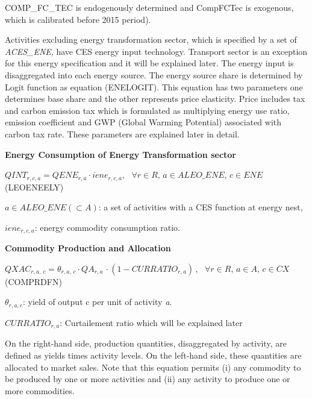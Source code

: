 \documentclass[10pt,a4paper,titlepage,dvipdfmx]{book}
\begin{document}
COMP\_FC\_TEC  is endogenously determined and CompFCTec is exogenous, which is calibrated before 2015 period).

Activities excluding energy transformation sector, which is specified by a set of \textit{ACES\_ENE}, have CES energy input technology. Transport sector is an exception for this energy specification and it will be explained later. The energy input is disaggregated into each energy source. The energy source share is determined by Logit function as equation (ENELOGIT). This equation has two parameters one determines base share and the other represents price elasticity. Price includes tax and carbon emission tax which is formulated as multiplying energy use ratio, emission coefficient and GWP (Global Warming Potential) associated with carbon tax rate. These parameters are explained later in detail.

\begin{flushleft}\textbf{Energy Consumption of Energy Transformation sector}\end{flushleft}


\begin{center}$QINT_{r,c,a}=QENE_{r,a}\cdot iene_{r,c,a},\,\,\,\,\forall r\in R,\,a\in ALEO\_ ENE,\,c\in ENE$ (LEOENEELY)
\end{center}

$a\in ALEO\_ ENE\left(\subset A\right)$: a set of activities with a CES function at energy nest,

\begin{flushleft}
$iene_{r,c,a}$: energy commodity consumption ratio.
\end{flushleft}

\begin{flushleft}\textbf{Commodity Production and Allocation}\end{flushleft}


\begin{center}$QXAC_{r,a,\,c}=\theta _{r,a,\,c}\cdot QA_{r,a}\,\cdot \left(1-CURRATIO_{r,a}\right)\,,\,\,\,\,\forall r\in R,\,a\in A,\,c\in CX$ (COMPRDFN)
\end{center}

\begin{flushleft}
${\theta}_{r,a,c}$: yield of output c per unit of activity \textit{a}.

$CURRATIO_{r,a}$: Curtailement ratio which will be explained later
\end{flushleft}

On the right-hand side, production quantities, disaggregated by activity, are defined as yields times activity levels. On the left-hand side, these quantities are allocated to market sales. Note that this equation permits (i) any commodity to be produced by one or more activities and (ii) any activity to produce one or more commodities.
\end{document}
